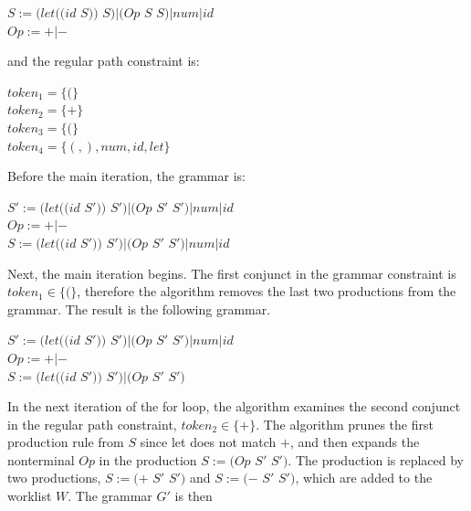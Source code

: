 \begin{center}

$S :=  (let ((id$ $S))$ $S) | (Op$ $S$ $S) | num | id$ \\
$Op := + | −$ 


\end{center}

and the regular path constraint is:

\begin{center}


$token_1 = \{(\}$ \\
$token_2 = \{+\}$ \\
$token_3 = \{(\}$ \\
$token_4 = \{(, ), num, id, let\}$ \\

\end{center}

Before the main iteration, the grammar is:

\begin{center}

$S' :=  (let ((id$ $S'))$ $S') | (Op$ $S'$ $S') | num | id$ \\
$Op := + | −$ \\
$S :=  (let ((id$ $S'))$ $S') | (Op$ $S'$ $S') | num | id$ \\

\end{center}

Next, the main iteration begins. The first conjunct in the grammar constraint is $token_1 \in \{(\}$, therefore the algorithm removes the last two productions from the grammar. The result is the following grammar.

\begin{center}

$S' :=  (let ((id$ $S'))$ $S') | (Op$ $S'$ $S') | num | id$ \\
$Op := + | −$ \\
$S :=  (let ((id$ $S'))$ $S') | (Op$ $S'$ $S') $ \\

\end{center}

In the next iteration of the for loop, the algorithm examines the second conjunct in the regular path constraint,
$token_2 \in \{+\}$. The algorithm prunes the first production rule from $S$ since let does not match $+$, and then expands the nonterminal $Op$ in the production $S := (Op$ $S'$ $S')$. The production is replaced by two productions,
$S := (+$ $S'$ $S')$ and $S := (-$ $S'$ $S')$, which are added to the worklist $W$. The grammar $G'$ is then

